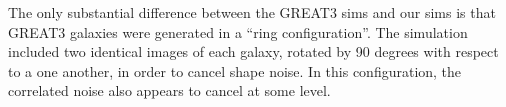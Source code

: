\documentclass[usegraphicx,usenatbib]{mn2e}
\newcommand{\mcal}{metacalibration}
\begin{document}
The only substantial difference between the GREAT3 sims and our sims is that
GREAT3 galaxies were generated in a ``ring configuration''.  The simulation
included two identical images of each galaxy, rotated by 90 degrees with
respect to a one another, in order to cancel shape noise.  In this configuration,
the correlated noise also appears to cancel at some level.

\end{document}
